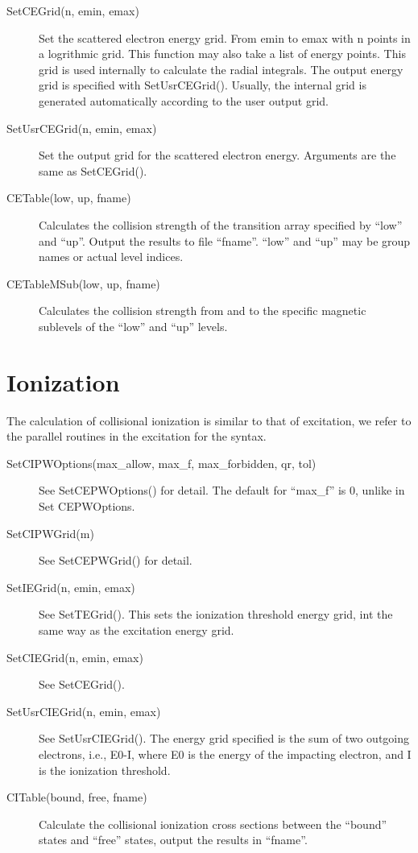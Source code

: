 \documentclass[12pt]{article}
\begin{document}
\begin{description}
\item[SetCEGrid(n, emin, emax)] 
Set the scattered electron energy grid. From emin to emax with n points in a
logrithmic grid. This function may also take a list of energy points. This
grid is used internally to calculate the radial integrals. The output energy
grid is specified with SetUsrCEGrid(). Usually, the internal grid is generated
automatically according to the user output grid. 

\item[SetUsrCEGrid(n, emin, emax)]
Set the output grid for the scattered electron energy. Arguments are the same
as SetCEGrid().

\item[CETable(low, up, fname)] Calculates the collision strength of the
transition array specified by ``low'' and ``up''. Output the results to file
``fname''. ``low'' and ``up'' may be group names or actual level indices.

\item[CETableMSub(low, up, fname)] Calculates the collision strength from and
to the specific magnetic sublevels of the ``low'' and ``up'' levels.

\end{description}

\section{Ionization}
The calculation of collisional ionization is similar to that of excitation, we
refer to the parallel routines in the excitation for the syntax.
\begin{description}
\item[SetCIPWOptions(max\_allow, max\_f, max\_forbidden, qr, tol)] 
See SetCEPWOptions() for detail. The default for ``max\_f'' is 0, unlike in 
Set CEPWOptions.

\item[SetCIPWGrid(m)]
See SetCEPWGrid() for detail.

\item[SetIEGrid(n, emin, emax)]
See SetTEGrid(). This sets the ionization threshold energy grid, int the same
way as the excitation energy grid.

\item[SetCIEGrid(n, emin, emax)]
See SetCEGrid().

\item[SetUsrCIEGrid(n, emin, emax)]
See SetUsrCIEGrid(). The energy grid specified is the sum of two outgoing
electrons, i.e., E0-I, where E0 is the energy of the impacting electron, and I
is the ionization threshold.

\item[CITable(bound, free, fname)] 
Calculate the collisional ionization cross sections between the ``bound''
states and ``free'' states, output the results in ``fname''.
\end{description}
\end{document}
